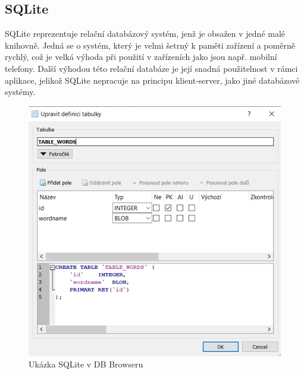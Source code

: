 \documentclass{vskpou} %
\begin{document}
\subsection{SQLite}
SQLite reprezentuje relační databázový systém, jenž je obsažen v jedné malé knihovně. Jedná se o systém, který je velmi šetrný k paměti zařízení a poměrně rychlý, což je velká výhoda při použití v zařízeních jako jsou např. mobilní telefony. Další výhodou této relační databáze je její snadná použitelnost v rámci aplikace, jelikož SQLite nepracuje na principu klient-server, jako jiné databázové systémy.\cite{9} 
 
 \begin{figure}[h!]
\centering
\includegraphics[scale=0.4]{images/14.jpg}
\caption{Ukázka SQLite v DB Browseru}
\label{14}
\end{figure}

%


\end{document}
